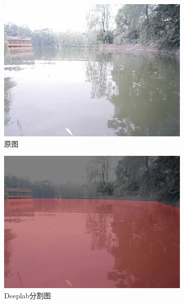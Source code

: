 \documentclass[cn,12pt,color=mine,scheme=chinese,bibstyle=gb7714-2015]{elegantbook}
\begin{document}
\begin{figure}[h]
\begin{subfigure}[b]{0.23\linewidth}
		\centering\includegraphics[width=\linewidth]{results2/test6}
		\caption{\label{fig:ori}原图}
	\end{subfigure}
	\begin{subfigure}[b]{0.23\linewidth}
		\centering\includegraphics[width=\linewidth]{results2/test6deeplab}\caption{\label{fig:deeplab}Deeplab分割图}
	\end{subfigure}
	\begin{subfigure}[b]{0.23\linewidth}

\end{subfigure}
\end{figure}
\end{document}
